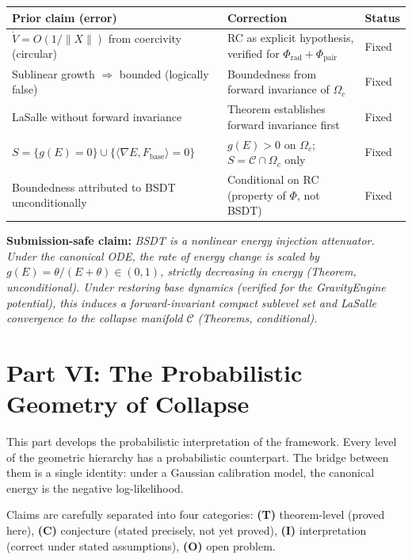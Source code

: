 \documentclass[11pt,a4paper]{article}
\theoremstyle{definition}
\newcommand{\Fbase}{F_{\mathrm{base}}}
\begin{document}
\begin{center}
\renewcommand{\arraystretch}{1.3}
\begin{tabular}{p{}p{}p{}}
\toprule
\textbf{Prior claim (error)} & \textbf{Correction} & \textbf{Status} \\
\midrule
$\dot V = O(1/\|X\|)$ from coercivity (circular) &
RC as explicit hypothesis, verified for $\Phi_\mathrm{rad}+\Phi_\mathrm{pair}$ &
Fixed \\
Sublinear growth $\Rightarrow$ bounded (logically false) &
Boundedness from forward invariance of $\Omega_c$ &
Fixed \\
LaSalle without forward invariance &
Theorem establishes forward invariance first &
Fixed \\
$S = \{g(E)=0\}\cup\{\langle\nabla E,\Fbase\rangle=0\}$ &
$g(E)>0$ on $\Omega_c$; $S=\mathcal{C}\cap\Omega_c$ only &
Fixed \\
Boundedness attributed to BSDT unconditionally &
Conditional on RC (property of $\Phi$, not BSDT) &
Fixed \\
\bottomrule
\end{tabular}
\end{center}

\noindent
\textbf{Submission-safe claim:}
\textit{BSDT is a nonlinear energy injection attenuator.
Under the canonical ODE, the rate of energy change is scaled by
$g(E)=\theta/(E+\theta)\in(0,1)$, strictly decreasing in energy
(Theorem, unconditional).
Under restoring base dynamics (verified for the GravityEngine potential),
this induces a forward-invariant compact sublevel set and LaSalle convergence
to the collapse manifold $\mathcal{C}$ (Theorems, conditional).}

\newpage
\part*{Part VI: The Probabilistic Geometry of Collapse}

\noindent
This part develops the probabilistic interpretation of the framework.
Every level of the geometric hierarchy has a probabilistic counterpart.
The bridge between them is a single identity: under a Gaussian calibration model,
the canonical energy is the negative log-likelihood.

Claims are carefully separated into four categories:
\textbf{(T)} theorem-level (proved here),
\textbf{(C)} conjecture (stated precisely, not yet proved),
\textbf{(I)} interpretation (correct under stated assumptions),
\textbf{(O)} open problem.
\end{document}
